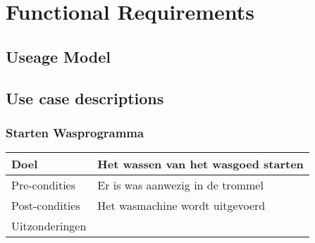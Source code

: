 \chapter{Functional Requirements}
\section{Useage Model}

\section{Use case descriptions}
\subsection{Starten Wasprogramma}

\begin{tabular}{ | p{4cm} | p{8.5cm} | }

\hline
Doel & Het wassen van het wasgoed starten \\
\hline
Pre-condities & Er is was aanwezig in de trommel \\
\hline
Post-condities & Het wasmachine wordt uitgevoerd \\
\hline
Uitzonderingen & \\
\hline

\end{tabular}